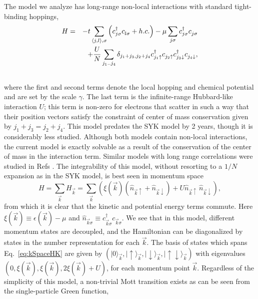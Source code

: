 \documentclass[prl,aps,twocolumn,groupaddress]{revtex4-1}
\begin{document}
The model\cite{hk1992,hk1996} we analyze has long-range non-local interactions  with standard tight-binding hoppings, 
 \begin{eqnarray}\nonumber
	H &=& -t \sum_{\langle j,l\rangle,\sigma} \pqty{ c^\dagger_{j\sigma} c^{}_{l\sigma} + h.c. }  - \mu \sum_{j\sigma} c^\dagger_{j\sigma} c^{}_{j\sigma}\\
&& + \frac{U}{N} \sum_{j_1..j_4}\delta_{j_1+ j_3, j_2+ j_4} c^\dagger_{j_1\uparrow} c^{}_{j_2\uparrow} c^\dagger_{j_3\downarrow} c^{}_{j_4\downarrow},\\ \nonumber
\end{eqnarray}
where the first and second terms denote the local hopping and chemical potential and are set by the scale $\gamma$. The last term is the infinite-range Hubbard-like interaction $U$; this term is non-zero for electrons that scatter in such a way that their position vectors satisfy the constraint of center of mass conservation given by $j_1+j_3 = j_2 + j_4$.  This model predates the SYK\cite{sy1993,k2015} model by 2 years,
though it is considerably less studied. Although both models contain non-local interactions, the current model is exactly solvable as a result of the conservation of the center of mass in the interaction term. Similar models with long range correlations were studied in Refs \cite{baskaran1991exactly,muthukumar1994toy,continentino1994scaling}. The integrability of this model, without resorting to a $1/N$ expansion as in the SYK model\cite{sy1993,k2015}, is best seen in momentum space
\begin{equation}
	H = \sum_{\vec k}H_{\vec k} = \sum_{\vec k} \left (\xi(\vec k)(\hat{n}_{\vec k\uparrow} + \hat{n}_{\vec k\downarrow} ) + U  \hat{n}_{\vec k\uparrow} \, \hat{n}_{\vec k\downarrow}\right),
\label{eq:kSpaceHK}
\end{equation}
from which it is clear that the kinetic and potential energy terms commute.   Here  $\xi(\vec k) \equiv \epsilon(\vec k ) - \mu$ and $\hat{n}_{\vec k \sigma} \equiv c_{\vec k \sigma}^{\dagger} c_{\vec k \sigma}$.  We see that in this model, different momentum states are decoupled, and the Hamiltonian can be diagonalized by states in the number representation for each $\vec k$. The basis of states which spans Eq.~\ref{eq:kSpaceHK} are given by $\left(\mid0\rangle_{\vec k}, \mid \uparrow\rangle_{\vec k}, \mid\downarrow \rangle_{\vec k}, \mid\uparrow\downarrow \rangle_{\vec k}\right)$ with eigenvalues $\left(0,\xi(\vec k),\xi(\vec k), 2 \xi(\vec k) + U\right)$, for each momentum point $\vec k$.  Regardless of the simplicity of this model, a non-trivial Mott transition exists as can be seen from the single-particle Green function,
\end{document}

